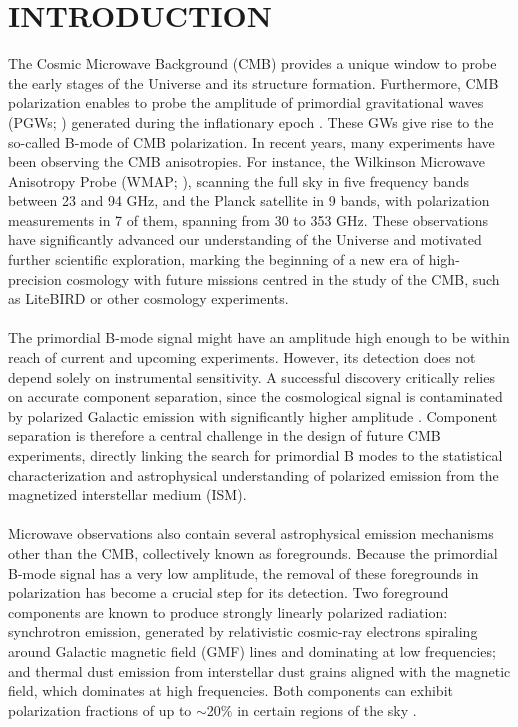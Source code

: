 \section{INTRODUCTION}
\label{sec:introduction}


The Cosmic Microwave Background (CMB) provides a unique window to probe the early stages of the Universe and its structure formation. Furthermore, CMB polarization enables to probe the amplitude of primordial gravitational waves (PGWs; \citealp{BICEP2}) generated during the inflationary epoch \citep{CMB_tests_of_inflation, CMB_polarization}. These GWs give rise to the so-called B-mode of CMB polarization. In recent years, many experiments have been observing the CMB anisotropies. For instance, the Wilkinson Microwave Anisotropy Probe (WMAP; \citealp{WMAP_9_year_results}), scanning the full sky in five frequency bands between 23 and 94 GHz, and the Planck satellite \citep{Planck_2018VI} in 9 bands, with polarization measurements in 7 of them, spanning from 30 to 353 GHz. These observations have significantly advanced our understanding of the Universe and motivated further scientific exploration, marking the beginning of a new era of high-precision cosmology with future missions centred in the study of the CMB, such as LiteBIRD \citep{LiteBIRD} or other cosmology experiments.

\paragraph{}

The primordial B-mode signal might have an amplitude high enough to be within reach of current and upcoming experiments. However, its detection does not depend solely on instrumental sensitivity. A successful discovery critically relies on accurate component separation, since the cosmological signal is contaminated by polarized Galactic emission with significantly higher amplitude \citep{BICEP2, Planck_2015XIX}. Component separation is therefore a central challenge in the design of future CMB experiments, directly linking the search for primordial B modes to the statistical characterization and astrophysical understanding of polarized emission from the magnetized interstellar medium (ISM).


\paragraph{}

Microwave observations also contain several astrophysical emission mechanisms other than the CMB, collectively known as foregrounds. Because the primordial B-mode signal has a very low amplitude, the removal of these foregrounds in polarization has become a crucial step for its detection. Two foreground components are known to produce strongly linearly polarized radiation: synchrotron emission, generated by relativistic cosmic-ray electrons spiraling around Galactic magnetic field (GMF) lines and dominating at low frequencies; and thermal dust emission from interstellar dust grains aligned with the magnetic field, which dominates at high frequencies. Both components can exhibit polarization fractions of up to $\sim$20$\%$ in certain regions of the sky \citep{Planck_2015XIX}.

